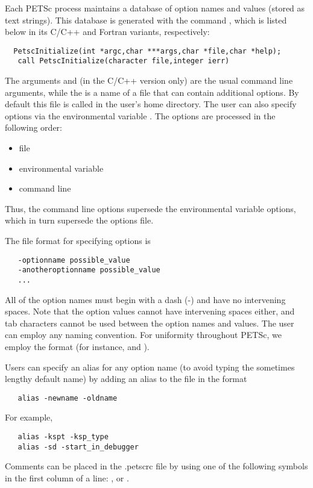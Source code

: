 Each PETSc process maintains a database of option names and values
(stored as text strings). This database is generated with the command
, which is listed below in its C/C++ and
Fortran variants, respectively:
\begin{verbatim}
  PetscInitialize(int *argc,char ***args,char *file,char *help);
   call PetscInitialize(character file,integer ierr)
\end{verbatim}
The arguments  and  (in the C/C++ version only) are
the usual command line arguments, while the  is a name of
a file that can contain additional options. 
By default this file is called   in the 
user's home directory.  The user can also specify options via the
environmental variable .   
The options are processed in the following order:
\begin{itemize}
\item file
\item environmental variable
\item command line
\end{itemize}
Thus, the command line options supersede the environmental variable
options, which in turn supersede the options file.  

The file format for specifying options is 
\begin{verbatim}
   -optionname possible_value
   -anotheroptionname possible_value
   ...
\end{verbatim}
All of the option names must begin with a dash (-) and have no intervening 
spaces.  Note that the option values cannot
have intervening spaces either, and tab characters cannot be used
between the option names and values.
The user can employ any naming convention.  For uniformity throughout
PETSc, we employ the format  (for instance, 
 and ).

Users can specify an alias for any option name (to avoid typing the 
sometimes lengthy default name) by adding an alias to the 
  file in the format
 
\begin{verbatim}
   alias -newname -oldname
\end{verbatim}
For example,
\begin{verbatim}
   alias -kspt -ksp_type
   alias -sd -start_in_debugger
\end{verbatim}
Comments can be placed in the .petscrc file by using one of the
following symbols in the first column of a line: \trl{\#, \%}, or \trl{!}.

